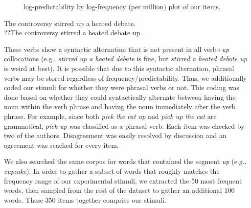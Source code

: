 \documentclass[
  authoryear,
  preprint,
  1p,
  onecolumn]{elsarticle}
\begin{document}
\begin{figure}


\caption{\label{fig-stimplot}log-predictability by log-frequency (per
million) plot of our items.}

\end{figure}%

\begin{exe} 
\ex
  \begin{xlist}
    \ex The controversy stirred up a heated debate. \\
    \ex ??The controversy stirred a heated debate up. \\
  \end{xlist}
\end{exe}

These verbs show a syntactic alternation that is not present in all
verb+\emph{up} collocations (e.g., \emph{stirred up a heated debate} is
fine, but \emph{stirred a heated debate up} is weird at best). It is
possible that due to this syntactic alternation, phrasal verbs may be
stored regardless of frequency/predictability. Thus, we additionally
coded our stimuli for whether they were phrasal verbs or not. This
coding was done based on whether they could syntactically alternate
between having the noun within the verb phrase and having the noun
immediately after the verb phrase. For example, since both \emph{pick
the cat up} and \emph{pick up the cat} are grammatical, \emph{pick up}
was classified as a phrasal verb. Each item was checked by two of the
authors. Disagreement was easily resolved by discussion and an agreement
was reached for every item.

We also searched the same corpus for words that contained the segment
\emph{up} (e.g., \emph{cupcake}). In order to gather a subset of words
that roughly matches the frequency range of our experimental stimuli, we
extracted the 50 most frequent words, then sampled from the rest of the
dataset to gather an additional 100 words. These 350 items together
comprise our stimuli.
\end{document}
